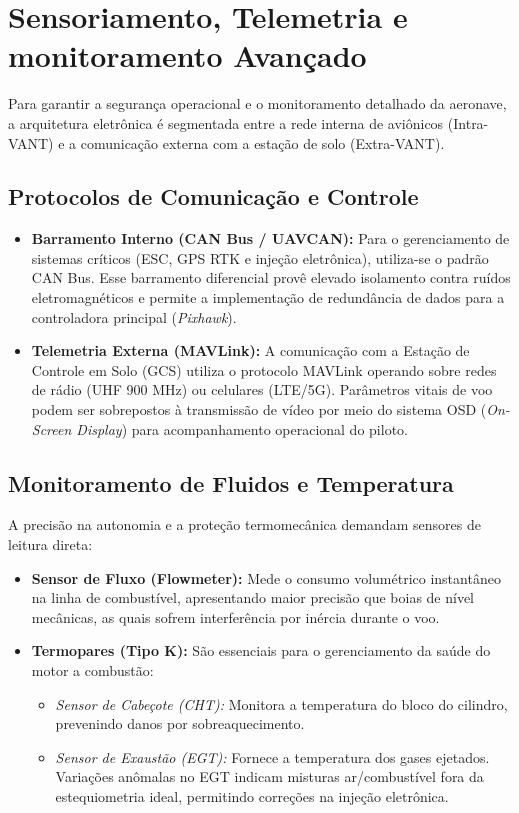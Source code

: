 \documentclass[a4paper,12pt]{article}
\begin{document}
\section{Sensoriamento, Telemetria e monitoramento Avançado}

Para garantir a segurança operacional e o monitoramento detalhado da aeronave, a arquitetura eletrônica é segmentada entre a rede interna de aviônicos (Intra-VANT) e a comunicação externa com a estação de solo (Extra-VANT).

\subsection{Protocolos de Comunicação e Controle}
\begin{itemize}
    \item \textbf{Barramento Interno (CAN Bus / UAVCAN):} Para o gerenciamento de sistemas críticos (ESC, GPS RTK e injeção eletrônica), utiliza-se o padrão CAN Bus. Esse barramento diferencial provê elevado isolamento contra ruídos eletromagnéticos e permite a implementação de redundância de dados para a controladora principal (\textit{Pixhawk}).
    
    \item \textbf{Telemetria Externa (MAVLink):} A comunicação com a Estação de Controle em Solo (GCS) utiliza o protocolo MAVLink operando sobre redes de rádio (UHF 900 MHz) ou celulares (LTE/5G). Parâmetros vitais de voo podem ser sobrepostos à transmissão de vídeo por meio do sistema OSD (\textit{On-Screen Display}) para acompanhamento operacional do piloto.
\end{itemize}

\subsection{Monitoramento de Fluidos e Temperatura}
A precisão na autonomia e a proteção termomecânica demandam sensores de leitura direta:

\begin{itemize}
    \item \textbf{Sensor de Fluxo (Flowmeter):} Mede o consumo volumétrico instantâneo na linha de combustível, apresentando maior precisão que boias de nível mecânicas, as quais sofrem interferência por inércia durante o voo.
    
    \item \textbf{Termopares (Tipo K):} São essenciais para o gerenciamento da saúde do motor a combustão:
    \begin{itemize}
        \item \textit{Sensor de Cabeçote (CHT):} Monitora a temperatura do bloco do cilindro, prevenindo danos por sobreaquecimento.
        \item \textit{Sensor de Exaustão (EGT):} Fornece a temperatura dos gases ejetados. Variações anômalas no EGT indicam misturas ar/combustível fora da estequiometria ideal, permitindo correções na injeção eletrônica.
    \end{itemize}
\end{itemize}
\end{document}
